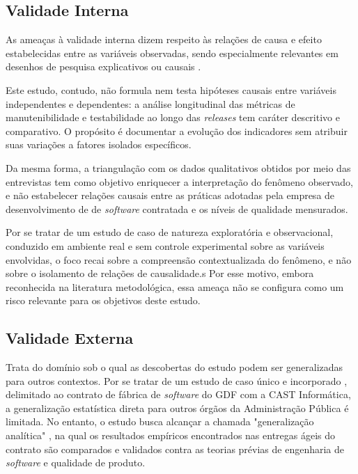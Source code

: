 \subsection{Validade Interna}


As ameaças à validade interna dizem respeito às relações de causa e efeito estabelecidas entre as variáveis observadas, sendo especialmente relevantes em desenhos de pesquisa explicativos ou causais \cite{Runeson_Host}.

Este estudo, contudo, não formula nem testa hipóteses causais entre variáveis independentes e dependentes: a análise longitudinal das métricas de manutenibilidade e testabilidade ao longo das \textit{releases} tem caráter descritivo e comparativo. O  propósito é documentar a evolução dos indicadores sem atribuir suas variações a fatores isolados específicos. 

Da mesma forma, a triangulação com os dados qualitativos obtidos por meio das entrevistas tem como objetivo enriquecer a interpretação do fenômeno observado, e não estabelecer relações causais entre as práticas adotadas pela empresa de desenvolvimento de de \textit{software} contratada  e os níveis de qualidade mensurados. 

Por se tratar de um estudo de caso de natureza exploratória e observacional, conduzido em ambiente real e sem controle experimental sobre as variáveis envolvidas, o foco recai sobre a compreensão contextualizada do fenômeno, e não sobre o isolamento de relações de causalidade.s Por esse motivo, embora reconhecida na literatura metodológica, essa ameaça não se configura como um risco relevante para os objetivos deste estudo.


\subsection{Validade Externa}

Trata do domínio sob o qual as descobertas do estudo podem ser generalizadas para outros contextos. Por se tratar de um estudo de caso único e incorporado \cite{yin2001estudo}, delimitado ao contrato de fábrica de \textit{software} do  GDF com a CAST Informática, a generalização estatística direta para outros órgãos da Administração Pública é limitada. No entanto, o estudo busca alcançar a chamada "generalização analítica" \cite{yin2001estudo}, na qual os resultados empíricos encontrados nas entregas ágeis do contrato são comparados e validados contra as teorias prévias de engenharia de \textit{software} e qualidade de produto.


